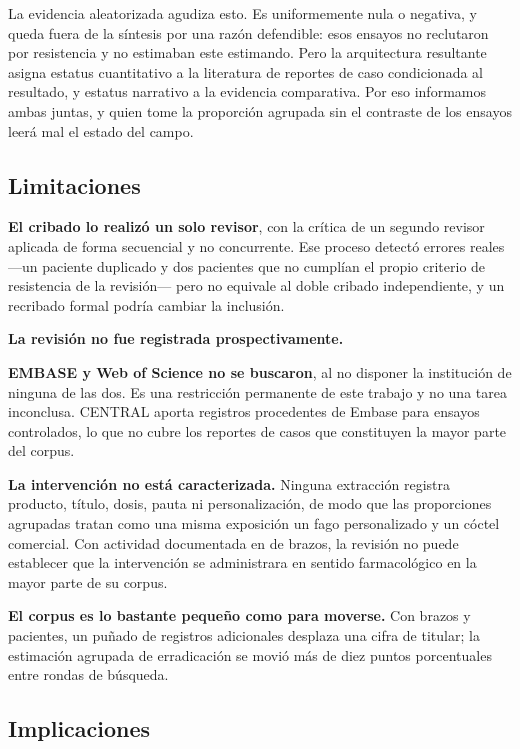 \documentclass[12pt]{article}
\begin{document}
La evidencia aleatorizada agudiza esto. Es uniformemente nula o negativa, y queda
fuera de la síntesis por una razón defendible: esos ensayos no reclutaron por
resistencia y no estimaban este estimando. Pero la arquitectura resultante asigna
estatus cuantitativo a la literatura de reportes de caso condicionada al
resultado, y estatus narrativo a la evidencia comparativa. Por eso informamos
ambas juntas, y quien tome la proporción agrupada sin el contraste de los ensayos
leerá mal el estado del campo.

\subsection*{Limitaciones}

\textbf{El cribado lo realizó un solo revisor}, con la crítica de un segundo
revisor aplicada de forma secuencial y no concurrente. Ese proceso detectó
errores reales ---un paciente duplicado y dos pacientes que no cumplían el propio
criterio de resistencia de la revisión--- pero no equivale al doble cribado
independiente, y un recribado formal podría cambiar la inclusión.

\textbf{La revisión no fue registrada prospectivamente.}

\textbf{EMBASE y Web of Science no se buscaron}, al no disponer la institución de
ninguna de las dos. Es una restricción permanente de este trabajo y no una tarea
inconclusa. CENTRAL aporta registros procedentes de Embase para ensayos
controlados, lo que no cubre los reportes de casos que constituyen la mayor parte
del corpus.

\textbf{La intervención no está caracterizada.} Ninguna extracción registra
producto, título, dosis, pauta ni personalización, de modo que las proporciones
agrupadas tratan como una misma exposición un fago personalizado y un cóctel
comercial. Con actividad documentada en \PhageSuscDocumented de \PhageSuscArms
brazos, la revisión no puede establecer que la intervención se administrara en
sentido farmacológico en la mayor parte de su corpus.

\textbf{El corpus es lo bastante pequeño como para moverse.} Con \ArmsAnalysed
brazos y \PatientsAnalysed pacientes, un puñado de registros adicionales desplaza
una cifra de titular; la estimación agrupada de erradicación se movió más de diez
puntos porcentuales entre rondas de búsqueda.

\subsection*{Implicaciones}
\end{document}
